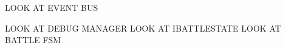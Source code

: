 \documentclass{article}
\title{}
\begin{document}

LOOK AT EVENT BUS

\clearpage
LOOK AT DEBUG MANAGER
LOOK AT IBATTLESTATE
LOOK AT BATTLE FSM

\clearpage

\clearpage

\clearpage

\end{document}
